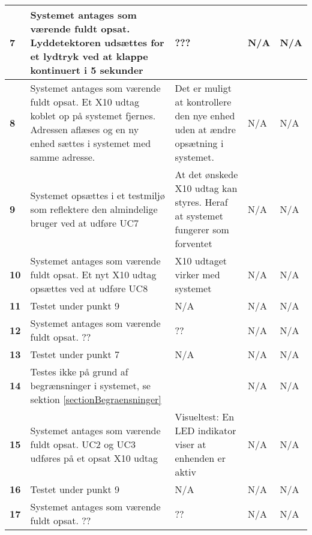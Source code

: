 \begin{center}
\begin{longtable}{|p{}|p{}|p{}|p{}|p{}|}
\textbf{7} &
Systemet antages som værende fuldt opsat.\newline
Lyddetektoren udsættes for et lydtryk ved at klappe kontinuert i 5 sekunder &
??? &
N/A &
N/A \\\hline

\textbf{8} &
Systemet antages som værende fuldt opsat.\newline
Et X10 udtag koblet op på systemet fjernes. Adressen aflæses og en ny enhed sættes i systemet med samme adresse.&
Det er muligt at kontrollere den nye enhed uden at ændre opsætning i systemet.&
N/A &
N/A \\\hline

\textbf{9} &
Systemet opsættes i et testmiljø som reflektere den almindelige bruger ved at udføre UC7&
At det ønskede X10 udtag kan styres. Heraf at systemet fungerer som forventet&
N/A &
N/A \\\hline

\textbf{10} &
Systemet antages som værende fuldt opsat.\newline
Et nyt X10 udtag opsættes ved at udføre UC8 &
X10 udtaget virker med systemet&
N/A &
N/A \\\hline

\textbf{11} &
Testet under punkt 9&
N/A &
N/A &
N/A \\\hline

\textbf{12} &
Systemet antages som værende fuldt opsat.\newline
??&
??&
N/A &
N/A \\\hline

\textbf{13} &
Testet under punkt 7&
N/A &
N/A &
N/A \\\hline

\textbf{14} &
Testes ikke på grund af begrænsninger i systemet, se sektion \ref{sectionBegraensninger}&
&
N/A &
N/A \\\hline

\textbf{15} &
Systemet antages som værende fuldt opsat.\newline
UC2 og UC3 udføres på et opsat X10 udtag&
Visueltest: En LED indikator viser at enhenden er aktiv&
N/A &
N/A \\\hline

\textbf{16} &
Testet under punkt 9&
N/A &
N/A &
N/A \\\hline

\textbf{17} &
Systemet antages som værende fuldt opsat.\newline
??&
??&
N/A &
N/A \\\hline


\end{longtable}
\end{center}
